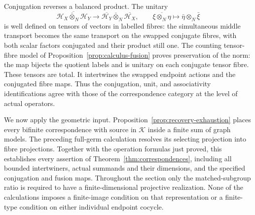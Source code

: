 Conjugation reverses a balanced product.  The unitary
\[
 \overline{\mathcal H_X\mathbin{\bar\otimes}_N\mathcal H_Y}
 \longrightarrow
 \overline{\mathcal H_Y}\mathbin{\bar\otimes}_N
       \overline{\mathcal H_X},
 \qquad
 \overline{\xi\otimes_N\eta}
       \longmapsto\bar\eta\otimes_N\bar\xi
\]
is well defined on tensors of vectors in labelled fibres: the
simultaneous middle transport
becomes the same transport on the swapped conjugate fibres, with
both scalar factors conjugated and their product still one.
The counting tensor-fibre model of
Proposition~\ref{prop:calculus-fusion} proves preservation of the norm:
the map bijects the quotient labels and is unitary on each conjugate
tensor fibre.  These tensors are total.  It intertwines the swapped
endpoint actions and the conjugated fibre maps.  Thus the conjugation,
unit, and associativity identifications agree with those of the
correspondence category at the level of actual operators.

We now apply the geometric input. Proposition~\ref{prop:recovery-exhaustion}
places every bifinite correspondence with source in $\mathscr K$ inside
a finite sum of graph models. The preceding full-germ calculation resolves
its selecting projection into fibre projections. Together with the operation
formulas just proved, this establishes every assertion of
Theorem~\ref{thm:correspondences}, including
all bounded intertwiners, actual summands and their dimensions, and
the specified conjugation and fusion maps.  Throughout the section
only the matched-subgroup ratio is required to have a
finite-dimensional projective realization.  None of the calculations
imposes a finite-image condition on that representation or a
finite-type condition on either individual endpoint cocycle.
